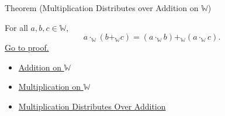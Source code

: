 \begin{theorembox}{Theorem (Multiplication Distributes over Addition on \texorpdfstring{$\mathbb{W}$}{W})}
\begin{theorem}
\label{thm:multiplication-distributes-over-addition-on-w}
For all $a,b,c\in\mathbb{W}$,
\[
a\cdot_{\mathbb{W}}(b+_{\mathbb{W}}c)
=
(a\cdot_{\mathbb{W}}b)+_{\mathbb{W}}(a\cdot_{\mathbb{W}}c).
\]
\hyperref[prf:multiplication-distributes-over-addition-on-w]{Go to proof.}
\end{theorem}
\end{theorembox}

\begin{dependencies}
\begin{itemize}
  \item \hyperref[def:addition-on-w]{Addition on $\mathbb{W}$}
  \item \hyperref[def:multiplication-on-w]{Multiplication on $\mathbb{W}$}
  \item \hyperref[thm:multiplication-distributes-over-addition]{Multiplication Distributes Over Addition}
\end{itemize}
\end{dependencies}
